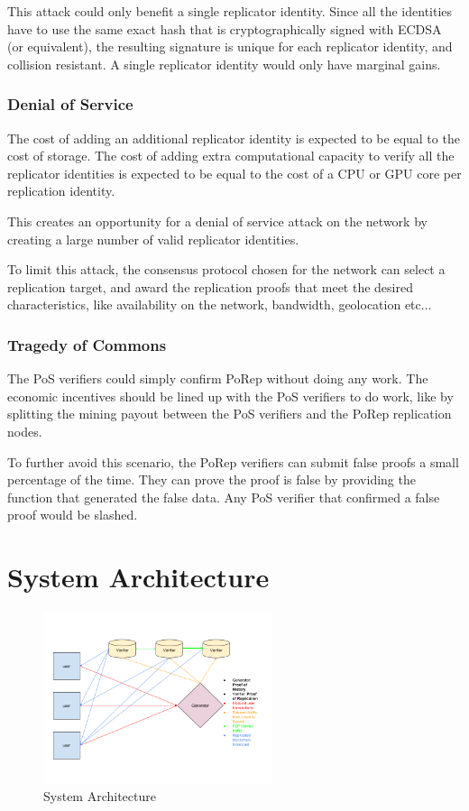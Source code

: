 \documentclass[12pt]{ltjsarticle}
\begin{document}
This attack could only benefit a single replicator identity. Since all the identities have to use the same exact hash that is cryptographically signed with ECDSA (or equivalent), the resulting signature is unique for each replicator identity, and collision resistant. A single replicator identity would only have marginal gains.
\subsubsection{Denial of Service}
The cost of adding an additional replicator identity is expected to be equal to the cost of storage. The cost of adding extra computational capacity to verify all the replicator identities is expected to be equal to the cost of a CPU or GPU core per replication identity.

This creates an opportunity for a denial of service attack on the network by creating a large number of valid replicator identities.

To limit this attack, the consensus protocol chosen for the network can select a replication target, and award the replication proofs that meet the desired characteristics, like availability on the network, bandwidth, geolocation etc...
\subsubsection{Tragedy of Commons}

The PoS verifiers could simply confirm PoRep without doing any work. The economic incentives should be lined up with the PoS verifiers to do work, like by splitting the mining payout between the PoS verifiers and the PoRep replication nodes.

To further avoid this scenario, the PoRep verifiers can submit false proofs a small percentage of the time. They can prove the proof is false by providing the function that generated the false data. Any PoS verifier that confirmed a false proof would be slashed.

\section{System Architecture}\label{system_architecture}

\begin{figure}
  \begin{center}
    \centering
    \includegraphics[width=0.6\textwidth]{../../figures/fig_9.png}
    \caption[Fig 9]{System Architecture \label{fig_9}}
  \end{center}
  \end{figure}
\end{document}
